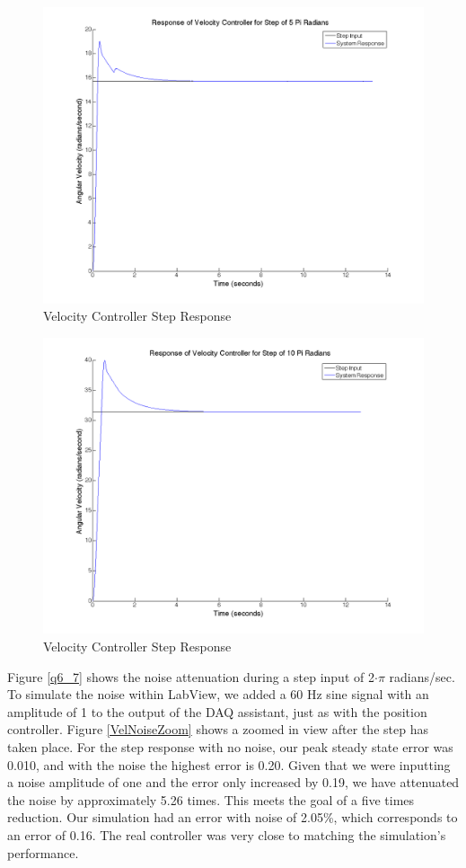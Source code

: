\documentclass{article}
\theoremstyle{plain}
\theoremstyle{definition}
\theoremstyle{remark}
\begin{document}
\begin{figure}[htb]
\begin{center}
\includegraphics[width = 12cm]{velstep5Pi.png}
\caption{Velocity Controller Step Response}
\label{q6_5}
\end{center}
\end{figure}

\begin{figure}[htb]
\begin{center}
\includegraphics[width = 12cm]{velstep10Pi.png}
\caption{Velocity Controller Step Response}
\label{q6_6}
\end{center}
\end{figure}

Figure \ref{q6_7} shows the noise attenuation during a step input of 2$\cdot\pi$ radians/sec. To simulate the noise within LabView, we added a 60 Hz sine signal with an amplitude of 1 to the output of the DAQ assistant, just as with the position controller. Figure \ref{VelNoiseZoom} shows a zoomed in view after the step has taken place. For the step response with no noise, our peak steady state error was 0.010, and with the noise the highest error is 0.20. Given that we were inputting a noise amplitude of one and the error only increased by 0.19, we have attenuated the noise by approximately 5.26 times. This meets the goal of a five times reduction. Our simulation had an error with noise of 2.05\%, which corresponds to an error of 0.16. The real controller was very close to matching the simulation's performance.\\
\end{document}
